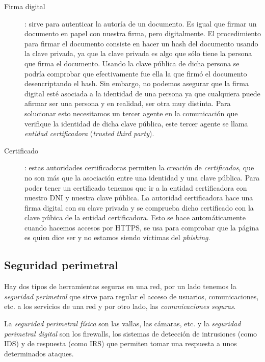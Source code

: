 \documentclass[10pt,a4paper,spanish]{report}
\begin{document}
\begin{description}
  \item[Firma digital]: sirve para autenticar la autoría de un documento. Es igual que firmar un documento en papel con nuestra firma, pero digitalmente. El procedimiento para firmar el documento consiste en hacer un hash del documento usando la clave privada, ya que la clave privada es algo que sólo tiene la persona que firma el documento. Usando la clave pública de dicha persona se podría comprobar que efectivamente fue ella la que firmó el documento desencriptando el hash. Sin embargo, no podemos asegurar que la firma digital esté asociada a la identidad de una persona ya que cualquiera puede afirmar ser una persona y en realidad, ser otra muy distinta. Para solucionar esto necesitamos un tercer agente en la comunicación que verifique la identidad de dicha clave pública, este tercer agente se llama \textit{\textcolor{tema2}{entidad certificadora}} (\textit{\textcolor{tema2}{trusted third party}}).
  \item[Certificado]: estas autoridades certificadoras permiten la creación de \textit{\textcolor{tema2}{certificados}}, que no son más que la asociación entre una identidad y una clave pública. Para poder tener un certificado tenemos que ir a la entidad certificadora con nuestro DNI y nuestra clave pública. La autoridad certificadora hace una firma digital con su clave privada y se comprueba dicho certificado con la clave púbica de la entidad certificadora. Esto se hace automáticamente cuando hacemos accesos por HTTPS, se usa para comprobar que la página es quien dice ser y no estamos siendo víctimas del \textit{\textcolor{tema2}{phishing}}.
\end{description}

\subsection{\textcolor{tema2}Seguridad perimetral}
Hay dos tipos de herramientas seguras en una red, por un lado tenemos la \textit{\textcolor{tema2}{seguridad perimetral}} que sirve para regular el acceso de usuarios, comunicaciones, etc. a los servicios de una red y por otro lado, las \textit{\textcolor{tema2}{comunicaciones seguras}}.

La \textcolor{tema2}{\textit{seguridad perimetral física}} son las vallas, las cámaras, etc. y la \textit{\textcolor{tema2}{seguridad perimetral digital}} son los firewalls, los sistemas de detección de intrusiones (como IDS) y de respuesta (como IRS) que permiten tomar una respuesta a unos determinados ataques.
\end{document}
